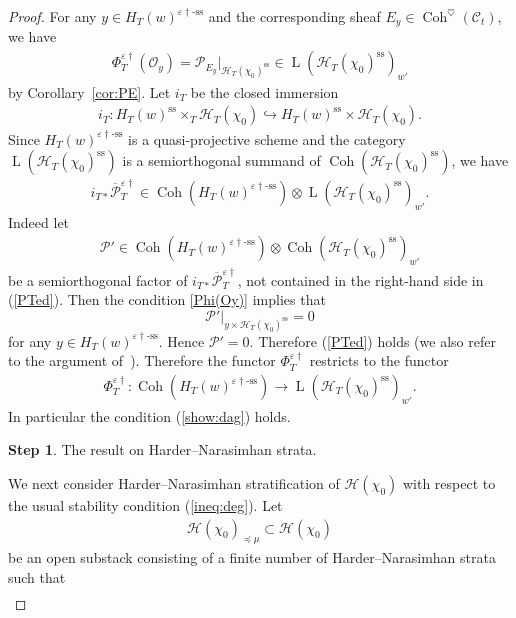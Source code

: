 \documentclass[11pt,oneside,a4paper,mathscr]{amsart}
\theoremstyle{definition}
\newtheorem{ssstep}{Step}
\newcommand{\LL}{\operatorname{L}}
\newcommand{\cH}{\mathcal{H}}
\newcommand{\cC}{\mathcal{C}}
\newcommand{\cP}{\mathcal{P}}
\newcommand{\Coh}{\operatorname{Coh}}
\newcommand{\vd}{\varepsilon\dag}
\newcommand{\vdss}{\varepsilon\dag\text{-ss}}
\begin{document}
\begin{proof}
For any $y\in H_T(w)^{\varepsilon\dag\text{-ss}}$ and the 
corresponding sheaf 
$E_y \in \Coh^{\heartsuit}(\cC_t)$, 
we have 
\begin{align}\label{Phi(Oy)}
    \Phi_T^{\varepsilon\dag}(\mathcal{O}_y)=\mathcal{P}_{E_y}|_{\cH_T(\chi_0)^{\mathrm{ss}}} \in \LL(\cH_T(\chi_0)^{\mathrm{ss}})_{w'}
\end{align}
by Corollary~\ref{cor:PE}. 
Let $i_T$ be the closed immersion 
\begin{align*}
    i_T \colon H_T(w)^{\mathrm{ss}}\times_T \cH_T(\chi_0) \hookrightarrow 
H_T(w)^{\mathrm{ss}}\times \cH_T(\chi_0).
\end{align*}
Since $H_T(w)^{\vdss}$ is a quasi-projective scheme and 
the category $\LL(\cH_T(\chi_0)^{\mathrm{ss}})$ is a semiorthogonal summand of 
$\Coh(\cH_T(\chi_0)^{\mathrm{ss}})$, 
 we have 
\begin{align}\label{PTed}
  i_{T*}  \overline{\cP}_T^{\vd} \in \Coh(H_T(w)^{\vdss}) \otimes \LL(\cH_T(\chi_0)^{\mathrm{ss}})_{w'}. 
\end{align}
Indeed let 
\begin{align*}\cP' \in 
\Coh(H_T(w)^{\vd\text{-ss}})\otimes \Coh(\cH_T(\chi_0)^{\mathrm{ss}})_{w'}
\end{align*}
be a semiorthogonal factor of $i_{T*}\overline{\cP}_T^{\vd}$, 
not contained in the right-hand side in (\ref{PTed}). 
Then the condition \eqref{Phi(Oy)} implies that 
\[
\cP'|_{y\times \cH_T(\chi_0)^{\mathrm{ss}}}=0
\]
for any $y\in H_T(w)^{\vd\text{-ss}}$. Hence $\cP'=0$. 
Therefore (\ref{PTed}) holds
(we also refer to the argument
of~\cite[Lemma~6.2]{PThiggs}). 
Therefore 
the functor $\Phi_T^{\varepsilon\dag}$ 
restricts to the functor 
\begin{align}\label{rest:L}
\Phi_T^{\varepsilon\dag} \colon 
    \Coh(H_T(w)^{\varepsilon\dag\text{-ss}}) \to 
  \LL(\cH_T(\chi_0)^{\mathrm{ss}})_{w'}. 
\end{align}
In particular the condition (\ref{show:dag}) holds. 
\begin{ssstep}
    The result on Harder--Narasimhan strata.
\end{ssstep}
We next consider Harder--Narasimhan stratification of $\cH(\chi_0)$ with respect to the usual stability condition (\ref{ineq:deg}). 
Let 
\begin{align*}
    \cH(\chi_0)_{\preceq \mu} \subset \cH(\chi_0)
\end{align*}
be an open substack 
consisting of a finite number of Harder--Narasimhan strata 
such that 
\begin{align*}

\end{align*}
\end{proof}
\end{document}
